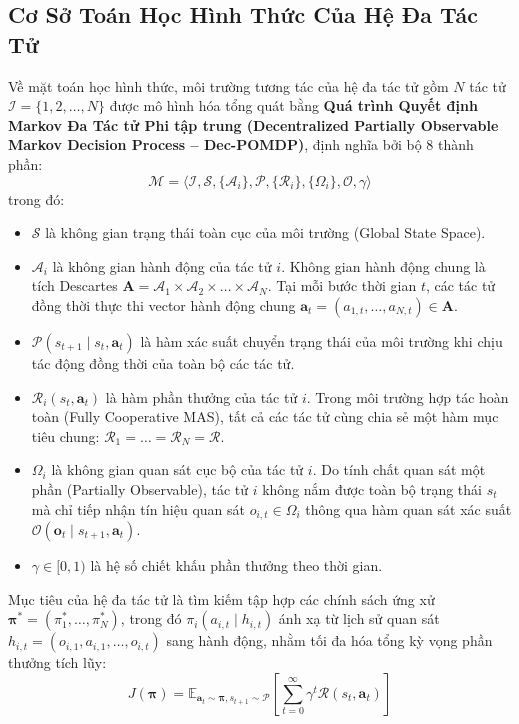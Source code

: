 \documentclass[12pt,a4paper]{report}
\begin{document}
\subsection{Cơ Sở Toán Học Hình Thức Của Hệ Đa Tác Tử}
Về mặt toán học hình thức, môi trường tương tác của hệ đa tác tử gồm $N$ tác tử $\mathcal{I} = \{1, 2, \dots, N\}$ được mô hình hóa tổng quát bằng \textbf{Quá trình Quyết định Markov Đa Tác tử Phi tập trung (Decentralized Partially Observable Markov Decision Process -- Dec-POMDP)}, định nghĩa bởi bộ 8 thành phần:
\begin{equation}
    \mathcal{M} = \langle \mathcal{I}, \mathcal{S}, \{\mathcal{A}_i\}, \mathcal{P}, \{\mathcal{R}_i\}, \{\Omega_i\}, \mathcal{O}, \gamma \rangle
\end{equation}
trong đó:
\begin{itemize}[leftmargin=1.2cm]
    \item $\mathcal{S}$ là không gian trạng thái toàn cục của môi trường (Global State Space).
    \item $\mathcal{A}_i$ là không gian hành động của tác tử $i$. Không gian hành động chung là tích Descartes $\mathbf{A} = \mathcal{A}_1 \times \mathcal{A}_2 \times \dots \times \mathcal{A}_N$. Tại mỗi bước thời gian $t$, các tác tử đồng thời thực thi vector hành động chung $\mathbf{a}_t = (a_{1,t}, \dots, a_{N,t}) \in \mathbf{A}$.
    \item $\mathcal{P}(s_{t+1} \mid s_t, \mathbf{a}_t)$ là hàm xác suất chuyển trạng thái của môi trường khi chịu tác động đồng thời của toàn bộ các tác tử.
    \item $\mathcal{R}_i(s_t, \mathbf{a}_t)$ là hàm phần thưởng của tác tử $i$. Trong môi trường hợp tác hoàn toàn (Fully Cooperative MAS), tất cả các tác tử cùng chia sẻ một hàm mục tiêu chung: $\mathcal{R}_1 = \dots = \mathcal{R}_N = \mathcal{R}$.
    \item $\Omega_i$ là không gian quan sát cục bộ của tác tử $i$. Do tính chất quan sát một phần (Partially Observable), tác tử $i$ không nắm được toàn bộ trạng thái $s_t$ mà chỉ tiếp nhận tín hiệu quan sát $o_{i,t} \in \Omega_i$ thông qua hàm quan sát xác suất $\mathcal{O}(\mathbf{o}_t \mid s_{t+1}, \mathbf{a}_t)$.
    \item $\gamma \in [0, 1)$ là hệ số chiết khấu phần thưởng theo thời gian.
\end{itemize}

Mục tiêu của hệ đa tác tử là tìm kiếm tập hợp các chính sách ứng xử $\boldsymbol{\pi}^* = (\pi_1^*, \dots, \pi_N^*)$, trong đó $\pi_i(a_{i,t} \mid h_{i,t})$ ánh xạ từ lịch sử quan sát $h_{i,t} = (o_{i,1}, a_{i,1}, \dots, o_{i,t})$ sang hành động, nhằm tối đa hóa tổng kỳ vọng phần thưởng tích lũy:
\begin{equation}
    J(\boldsymbol{\pi}) = \mathbb{E}_{\mathbf{a}_t \sim \boldsymbol{\pi}, s_{t+1} \sim \mathcal{P}} \left[ \sum_{t=0}^{\infty} \gamma^t \mathcal{R}(s_t, \mathbf{a}_t) \right]
\end{equation}
\end{document}
